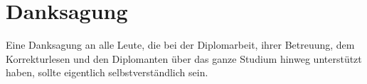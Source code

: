 \chapter*{Danksagung}



\setcounter{danksagung_seitenzahl}{\value{page}}

Eine Danksagung an alle Leute, die bei der Diplomarbeit, ihrer Betreuung,
dem Korrekturlesen und den Diplomanten über das ganze Studium hinweg
unterstützt haben, sollte eigentlich selbstverständlich sein.
